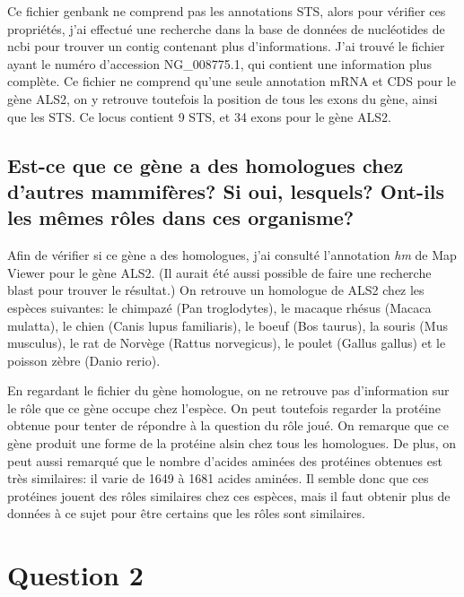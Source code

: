 \documentclass[11pt]{article} %
\begin{document}
Ce fichier genbank ne comprend pas les annotations STS, alors pour vérifier ces propriétés, j'ai effectué une recherche dans la
base de données de nucléotides de ncbi pour trouver un contig contenant plus d'informations. J'ai trouvé le fichier ayant le
numéro d'accession NG\_008775.1, qui contient une information plus complète. Ce fichier ne comprend qu'une seule annotation mRNA
et CDS pour le gène ALS2, on y retrouve toutefois la position de tous les exons du gène, ainsi que les STS. Ce locus contient
9 STS, et 34 exons pour le gène ALS2. 

\subsection[Homologues du gène ALS2]{Est-ce que ce gène a des homologues chez d'autres mammifères? Si oui, lesquels? Ont-ils les
mêmes rôles dans ces organisme?}

Afin de vérifier si ce gène a des homologues, j'ai consulté l'annotation \emph{hm} de Map Viewer pour le gène ALS2. (Il aurait
été aussi possible de faire une recherche blast pour trouver le résultat.) On retrouve un homologue de ALS2 chez les espèces suivantes:
le chimpazé (Pan troglodytes), le macaque rhésus (Macaca mulatta), le chien (Canis lupus familiaris), le boeuf (Bos taurus), la souris
(Mus musculus), le rat de Norvège (Rattus norvegicus), le poulet (Gallus gallus) et le poisson zèbre (Danio rerio). 

En regardant le fichier du gène homologue, on ne retrouve pas d'information sur le rôle que ce gène occupe
chez l'espèce. On peut toutefois regarder la protéine obtenue pour tenter de répondre à la question du rôle joué.
On remarque que ce gène produit une forme de la protéine alsin chez tous les homologues. De plus, on peut aussi remarqué
que le nombre d'acides aminées des protéines obtenues est très similaires: il varie de 1649 à 1681 acides aminées. Il semble
donc que ces protéines jouent des rôles similaires chez ces espèces, mais il faut obtenir plus de données à ce sujet pour être 
certains que les rôles sont similaires.

 
\section{Question 2} %
\end{document}
